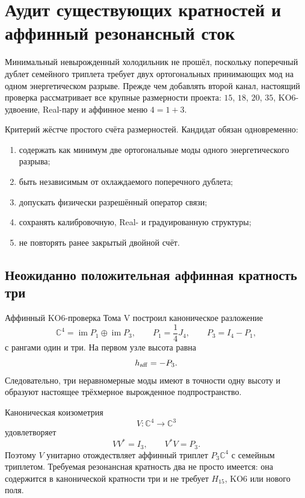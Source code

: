 \chapter{Аудит существующих кратностей и аффинный резонансный сток}

Минимальный невырожденный холодильник не прошёл, поскольку поперечный
дублет семейного триплета требует двух ортогональных принимающих мод на
одном энергетическом разрыве. Прежде чем добавлять второй канал, настоящий
проверка рассматривает все крупные размерности проекта: $15$, $18$, $20$, $35$,
KO6-удвоение, Real-пару и аффинное меню $4=1+3$.

Критерий жёстче простого счёта размерностей. Кандидат обязан одновременно:
\begin{enumerate}
 \item содержать как минимум две ортогональные моды одного энергетического
 разрыва;
 \item быть независимым от охлаждаемого поперечного дублета;
 \item допускать физически разрешённый оператор связи;
 \item сохранять калибровочную, Real- и градуированную структуры;
 \item не повторять ранее закрытый двойной счёт.
\end{enumerate}

\section{Неожиданно положительная аффинная кратность три}

Аффинный KO6-проверка Тома V построил каноническое разложение
\begin{equation}
 \mathbb C^4=\operatorname{im}P_1\oplus\operatorname{im}P_3,
 \qquad
 P_1=\frac14J_4,
 \qquad
 P_3=I_4-P_1,
 \label{eq:v6-affine-sink-one-plus-three}
\end{equation}
с рангами один и три. На первом узле высота равна
\begin{equation}
 h_{\rm aff}=-P_3.
 \label{eq:v6-affine-sink-height}
\end{equation}
Следовательно, три неравномерные моды имеют в точности одну высоту и
образуют настоящее трёхмерное вырожденное подпространство.

Каноническая коизометрия
\begin{equation}
 V:\mathbb C^4\longrightarrow\mathbb C^3
\end{equation}
удовлетворяет
\begin{equation}
 VV^*=I_3,
 \qquad
 V^*V=P_3.
 \label{eq:v6-affine-sink-coisometry}
\end{equation}
Поэтому $V$ унитарно отождествляет аффинный триплет $P_3\mathbb C^4$ с
семейным триплетом. Требуемая резонансная кратность два не просто имеется:
она содержится в канонической кратности три и не требует $H_{15}$,
KO6 или нового поля.

